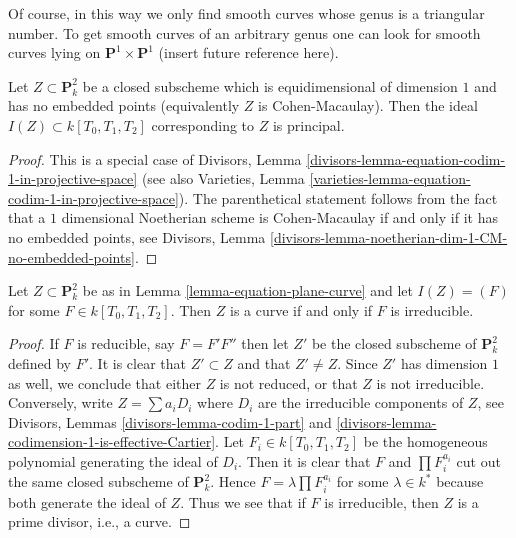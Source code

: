 \medskip\noindent
Of course, in this way we only find smooth curves whose genus
is a triangular number. To get smooth curves of an arbitrary
genus one can look for smooth curves lying on
$\mathbf{P}^1 \times \mathbf{P}^1$ (insert future reference here).

\begin{lemma}
\label{lemma-equation-plane-curve}
Let $Z \subset \mathbf{P}^2_k$ be a closed subscheme which
is equidimensional of dimension $1$ and has no embedded points
(equivalently $Z$ is Cohen-Macaulay).
Then the ideal $I(Z) \subset k[T_0, T_1, T_2]$ corresponding
to $Z$ is principal.
\end{lemma}

\begin{proof}
This is a special case of
Divisors, Lemma \ref{divisors-lemma-equation-codim-1-in-projective-space}
(see also Varieties, Lemma
\ref{varieties-lemma-equation-codim-1-in-projective-space}).
The parenthetical statement follows from the fact that a
$1$ dimensional Noetherian scheme is Cohen-Macaulay
if and only if it has no embedded points, see
Divisors, Lemma \ref{divisors-lemma-noetherian-dim-1-CM-no-embedded-points}.
\end{proof}

\begin{lemma}
\label{lemma-plane-curve}
Let $Z \subset \mathbf{P}^2_k$ be as in Lemma \ref{lemma-equation-plane-curve}
and let $I(Z) = (F)$ for some $F \in k[T_0, T_1, T_2]$.
Then $Z$ is a curve if and only if $F$ is irreducible.
\end{lemma}

\begin{proof}
If $F$ is reducible, say $F = F' F''$ then let $Z'$ be the closed subscheme
of $\mathbf{P}^2_k$ defined by $F'$. It is clear that $Z' \subset Z$
and that $Z' \not = Z$. Since $Z'$ has dimension $1$ as well, we conclude
that either $Z$ is not reduced, or that $Z$ is not irreducible.
Conversely, write $Z = \sum a_i D_i$ where $D_i$ are the irreducible
components of $Z$, see
Divisors, Lemmas \ref{divisors-lemma-codim-1-part} and
\ref{divisors-lemma-codimension-1-is-effective-Cartier}.
Let $F_i \in k[T_0, T_1, T_2]$ be the homogeneous
polynomial generating the ideal of $D_i$. Then it is clear that
$F$ and $\prod F_i^{a_i}$ cut out the same closed subscheme of
$\mathbf{P}^2_k$. Hence $F = \lambda \prod F_i^{a_i}$ for some
$\lambda \in k^*$ because both generate the ideal of $Z$.
Thus we see that if $F$ is irreducible, then $Z$ is
a prime divisor, i.e., a curve.
\end{proof}

